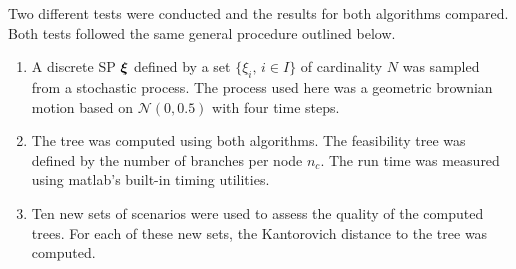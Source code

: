 Two different tests were conducted and the results for both algorithms compared.
Both tests followed the same general procedure outlined below.
\begin{enumerate}
\item A discrete SP $\boldsymbol\xi$ defined by a set $\{\xi_i,\, i\in I\}$ of cardinality $N$ was sampled from a stochastic process.
  The process used here was a geometric brownian motion based on $\mathcal{N}(0,0.5)$ with four time steps.
\item The tree was computed using both algorithms.
  The feasibility tree was defined by the number of branches per node $n_c$.
  The run time was measured using {\sc matlab}'s built-in timing utilities.
\item Ten new sets of scenarios were used to assess the quality of the computed trees.
  For each of these new sets, the Kantorovich distance to the tree was computed.
\end{enumerate}

